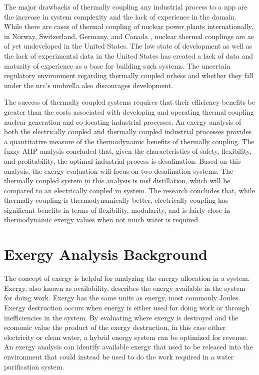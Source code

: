 The major drawbacks of thermally coupling any industrial process to a \ac{npp} are the increase in system complexity and the lack of experience in the domain. While there are cases of thermal coupling of nuclear power plants internationally, in Norway, Switzerland, Germany, and Canada \cite{Verfondern},  nuclear thermal couplings are as of yet undeveloped in the United States.  The low state of development as well as the lack of experimental data in the United States has created a lack of data and maturity of experience as a base for building such systems.  The uncertain regulatory environment regarding thermally coupled \ac{nrhess} and whether they fall under the \ac{nrc}'s umbrella also discourages development.

The success of thermally coupled systems requires that their efficiency benefits be greater than the costs associated with developing and operating thermal coupling nuclear generation and co-locating industrial processes.  An exergy analysis of both the electrically coupled and thermally coupled industrial processes provides a quantitative measure of the thermodynamic benefits of thermally coupling. The fuzzy AHP analysis concluded that, given the characteristics of safety, flexibility, and profitability, the optimal industrial process is desalination. Based on this analysis, the exergy evaluation will focus on two desalination systems.  The thermally coupled system in this analysis is \ac{msf} distillation, which will be compared to an electrically coupled \ac{ro} system. The research concludes that, while thermally coupling is thermodynamically better, electrically coupling has significant benefits in terms of flexibility, modularity, and is fairly close in thermodynamic exergy values when not much water is required.

\section{Exergy Analysis Background}
The concept of exergy is helpful for analyzing the energy allocation in a system. Exergy, also known as availability, describes the energy available in the system for doing work. Exergy has the same units as energy, most commonly Joules. Exergy destruction occurs when energy is either used for doing work or through inefficiencies in the system.  By evaluating where exergy is destroyed and the economic value the product of the exergy destruction, in this case either electricity or clean water, a hybrid energy system can be optimized for revenue. An exergy analysis can identify available exergy that used to be released into the environment that could instead be used to do the work required in a water purification system.

